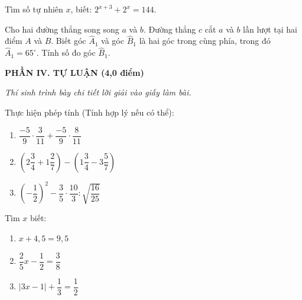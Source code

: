\documentclass[12pt,a4paper]{article}
\begin{document}
\vspace{1mm}
\begin{ex}
Tìm số tự nhiên $x$, biết: $2^{x+3} + 2^x = 144$. 
\end{ex}

\begin{ex}
Cho hai đường thẳng song song $a$ và $b$. Đường thẳng $c$ cắt $a$ và $b$ lần lượt tại hai điểm $A$ và $B$. Biết góc $\widehat{A}_1$ và góc $\widehat{B}_1$ là hai góc trong cùng phía, trong đó $\widehat{A}_1 = 65^\circ$. Tính số đo góc $\widehat{B}_1$. 
\end{ex}


\setcounter{ex}{0}
\noindent\textbf{\large PHẦN IV. TỰ LUẬN (4,0 điểm)}

\textit{Thí sinh trình bày chi tiết lời giải vào giấy làm bài.}

\vspace{1mm}
\begin{ex}
Thực hiện phép tính (Tính hợp lý nếu có thể):
\begin{enumerate}[label=\textbf{\alph*)}, leftmargin=0.8cm, itemsep=1pt]
\item $\dfrac{-5}{9} \cdot \dfrac{3}{11} + \dfrac{-5}{9} \cdot \dfrac{8}{11}$
\item $\left(2\dfrac{3}{4} + 1\dfrac{2}{7}\right) - \left(1\dfrac{3}{4} - 3\dfrac{5}{7}\right)$
\item $\left(-\dfrac{1}{2}\right)^2 - \dfrac{3}{5} \cdot \dfrac{10}{3} : \sqrt{\dfrac{16}{25}}$
\end{enumerate}
\end{ex}
\vspace{1.5mm}

\begin{ex}
Tìm $x$ biết:
\begin{enumerate}[label=\textbf{\alph*)}, leftmargin=0.8cm, itemsep=1pt]
\item $x + 4{,}5 = 9{,}5$
\item $\dfrac{2}{5} x - \dfrac{1}{2} = \dfrac{3}{8}$
\item $|3x - 1| + \dfrac{1}{3} = \dfrac{1}{2}$
\end{enumerate}
\end{ex}
\vspace{1.5mm}
\end{document}
